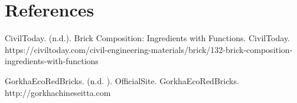 \section{References}
\setlength{\parindent}{0pt}
\vspace{1em}

CivilToday. (n.d.). Brick Composition: Ingredients with Functions. CivilToday. \\
https://civiltoday.com/civil-engineering-materials/brick/132-brick-composition-ingredients-with-functions

\vspace{1em}
GorkhaEcoRedBricks. (n.d. ). OfficialSite. GorkhaEcoRedBricks. \\
http://gorkhachineseitta.com